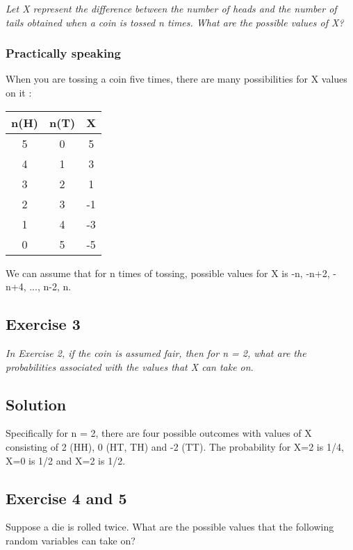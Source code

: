 \documentclass[12pt,a4paper]{article}
\begin{document}
\textit{Let X represent the difference between the number of heads and the number of tails obtained when a coin is tossed \textit{n} times. What are the possible values of X?}

\subsubsection{Practically speaking}

When you are tossing a coin five times, there are many possibilities for X values on it :

\begin{tabular}{|c|c|c|}
	\hline  n(H) & n(T)  & X  \\ 
	\hline  5    & 0     & 5  \\ 
	\hline  4    & 1     & 3  \\ 
	\hline  3    & 2     & 1  \\ 
	\hline  2    & 3     & -1  \\ 
	\hline  1    & 4     & -3  \\ 
	\hline  0    & 5     & -5  \\ 	
	\hline 
\end{tabular} 

We can assume that for n times of tossing, possible values for X is -n, -n+2, -n+4, ..., n-2, n.

\subsection{Exercise 3}

\textit{In Exercise 2, if the coin is assumed fair, then for n = 2, what are the probabilities associated with the values that X can take on}.

\subsection{Solution}

Specifically for n = 2, there are four possible outcomes with values of X consisting of 2 (HH), 0 (HT, TH) and -2 (TT). The probability for X=2 is 1/4, X=0 is 1/2 and X=2 is 1/2.  

\subsection{Exercise 4 and 5}

Suppose a die is rolled twice. What are the possible values that the following random variables can take on?
\end{document}
